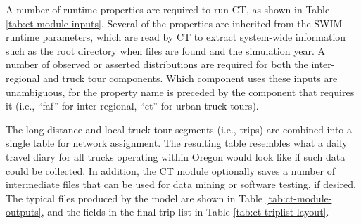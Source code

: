 A number of runtime properties are required to run CT, as shown in Table \ref{tab:ct-module-inputs}. Several of the properties are inherited from the SWIM runtime parameters, which are read by CT to extract system-wide information such as the root directory when files are found and the simulation year. A number of observed or asserted distributions are required for both the inter-regional and truck tour components. Which component uses these inputs are unambiguous, for the property name is preceded by the component that requires it (i.e., ``faf'' for inter-regional, ``ct'' for urban truck tours).



The long-distance and local truck tour segments (i.e., trips) are combined into a single table for network assignment. The resulting table resembles what a daily travel diary for all trucks operating within Oregon would look like if such data could be collected. In addition, the CT module optionally saves a number of intermediate files that can be used for data mining or software testing, if desired. The typical files produced by the model are shown in Table \ref{tab:ct-module-outputs}, and the fields in the final trip list in Table \ref{tab:ct-triplist-layout}. 



